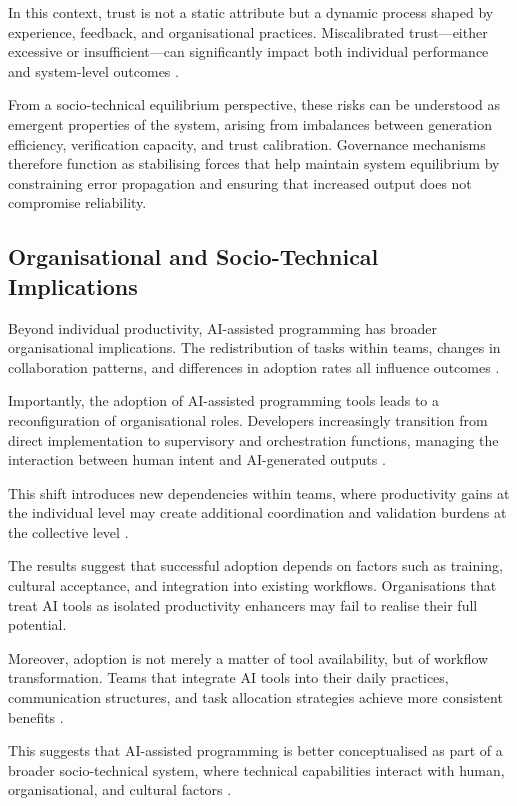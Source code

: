 \documentclass[conference]{IEEEtran}
\begin{document}
In this context, trust is not a static attribute but a dynamic process shaped by experience, feedback, and organisational practices. Miscalibrated trust—either excessive or insufficient—can significantly impact both individual performance and system-level outcomes \cite{kuhail_will_2024, hicks_new_2024}.

From a socio-technical equilibrium perspective, these risks can be understood as emergent properties of the system, arising from imbalances between generation efficiency, verification capacity, and trust calibration. Governance mechanisms therefore function as stabilising forces that help maintain system equilibrium by constraining error propagation and ensuring that increased output does not compromise reliability.

\subsection{Organisational and Socio-Technical Implications}

Beyond individual productivity, AI-assisted programming has broader organisational implications. The redistribution of tasks within teams, changes in collaboration patterns, and differences in adoption rates all influence outcomes \cite{koripalli_copilot_2025}.

Importantly, the adoption of AI-assisted programming tools leads to a reconfiguration of organisational roles. Developers increasingly transition from direct implementation to supervisory and orchestration functions, managing the interaction between human intent and AI-generated outputs \cite{chen_code_2025}.

This shift introduces new dependencies within teams, where productivity gains at the individual level may create additional coordination and validation burdens at the collective level \cite{weisz_examining_2025}.

The results suggest that successful adoption depends on factors such as training, cultural acceptance, and integration into existing workflows. Organisations that treat AI tools as isolated productivity enhancers may fail to realise their full potential.

Moreover, adoption is not merely a matter of tool availability, but of workflow transformation. Teams that integrate AI tools into their daily practices, communication structures, and task allocation strategies achieve more consistent benefits  \cite{chen_code_2025}.

This suggests that AI-assisted programming is better conceptualised as part of a broader socio-technical system, where technical capabilities interact with human, organisational, and cultural factors \cite{vasiliniuc_case_2023}.
\end{document}
